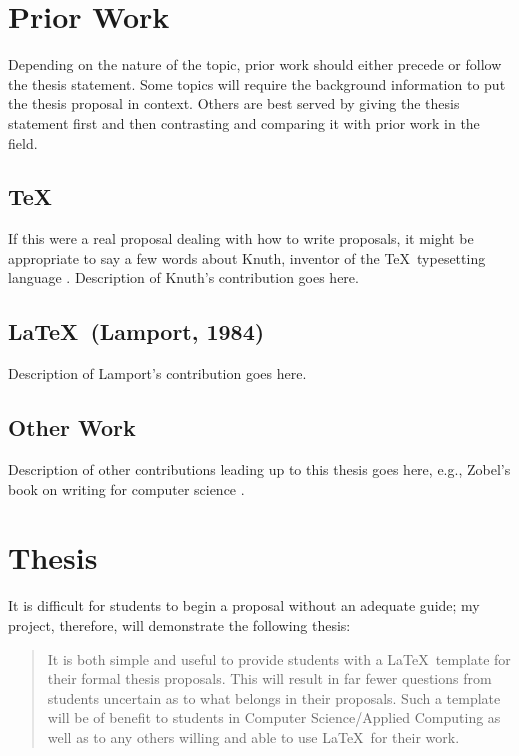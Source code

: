 \section{Prior Work}

Depending on the nature of the topic, prior work should either precede
or follow the thesis statement.  Some topics will require the
background information to put the thesis proposal in context.  Others
are best served by giving the thesis statement first and then contrasting
and comparing it with prior work in the field.

\subsection{\TeX}
If this were a real proposal dealing with how to write proposals,
it might be appropriate to say a few words
about Knuth, inventor of the \TeX\ typesetting language \cite{knuth:84}.
Description of Knuth's contribution goes here.

\subsection{\LaTeX\ (Lamport, 1984)}
Description of Lamport's contribution \cite{lamport:94} goes here.

\subsection{Other Work}
Description of other contributions leading up to this thesis goes here,
e.g., Zobel's book on writing for computer science \cite{zobel:97}.

\section{Thesis}

It is difficult for students to begin a proposal without an adequate guide;
my project, therefore, will demonstrate the following thesis:
\singlespace
\begin{quote}
It is both simple and useful to provide students with a \LaTeX\ template
for their formal thesis proposals.  This will result in far fewer
questions from students uncertain as to what belongs in their proposals.
Such a template will be of benefit to students in Computer
Science/Applied Computing as well as to any others willing and able
to use \LaTeX\ for their work.
\end{quote}
\doublespace

